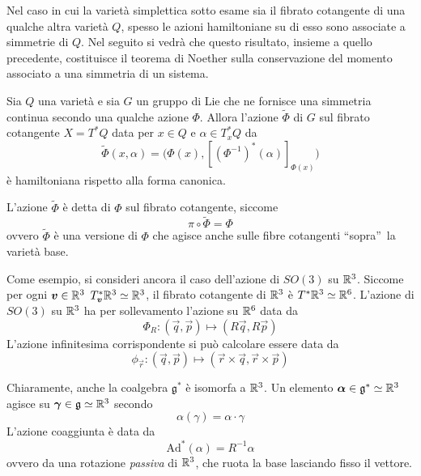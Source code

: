 Nel caso in cui la varietà simplettica sotto esame sia il fibrato cotangente di una qualche altra varietà $Q$, spesso le azioni hamiltoniane su di esso sono associate a simmetrie di $Q$. Nel seguito si vedrà che questo risultato, insieme a quello precedente, costituisce il teorema di Noether sulla conservazione del momento associato a una simmetria di un sistema.
\begin{theorem}
  Sia $Q$ una varietà e sia $G$ un gruppo di Lie che ne fornisce una simmetria continua secondo una qualche azione $\Phi$. Allora l'azione $\tilde{\Phi}$ di $G$ sul fibrato cotangente $X=T^*Q$ data per $x \in Q$ e $\alpha \in T^*_x Q$ da
  \begin{equation*}
  \tilde{\Phi}(x,\alpha) = \big(\Phi(x), [(\Phi^{-1})^*(\alpha)]_{\Phi(x)}\big)
  \end{equation*} 
  è hamiltoniana rispetto alla forma canonica.
\end{theorem}
\begin{remark}
  L'azione $\tilde{\Phi}$ è detta  di $\Phi$ sul fibrato cotangente, siccome \begin{equation*}
  \pi \circ \tilde{\Phi} = \Phi
  \end{equation*}
  ovvero $\tilde{\Phi}$ è una versione di $\Phi$ che agisce anche sulle fibre cotangenti \textquotedblleft sopra\textquotedblright\ la varietà base.
\end{remark}

Come esempio, si consideri ancora il caso dell'azione di $SO(3)$ su $\mathbb{R}^3$. Siccome per ogni $\boldsymbol{v} \in  \mathbb{R}^3$ $T^*_{\boldsymbol{v}}\mathbb{R}^3 \simeq \mathbb{R}^3$, il fibrato cotangente di $\mathbb{R}^3$ è $T^*\mathbb{R}^3 \simeq \mathbb{R}^6$. L'azione di $SO(3)$ su $\mathbb{R}^3$ ha per sollevamento l'azione su $\mathbb{R}^6$ data da 
\begin{equation*}
\Phi_R: (\vec{q},\vec{p}) \mapsto (R\vec{q},R\vec{p})
\end{equation*}  
L'azione infinitesima corrispondente si può calcolare essere data da
\begin{equation*}
\phi_{\vec{r}}: (\vec{q},\vec{p}) \mapsto (\vec{r}\times \vec{q},\vec{r}\times \vec{p})
\end{equation*}

Chiaramente, anche la coalgebra $\mathfrak{g}^*$ è isomorfa a $\mathbb{R}^3$. Un elemento $\boldsymbol{\alpha} \in \mathfrak{g}^* \simeq \mathbb{R}^3$ agisce su $\boldsymbol{\gamma} \in \mathfrak{g} \simeq \mathbb{R}^3$ secondo
\begin{equation*}
\alpha(\gamma) = \alpha \cdot \gamma
\end{equation*} 
L'azione coaggiunta è data da 
\begin{equation*}
\mathrm{Ad^*}(\alpha) = R^{-1}\alpha
\end{equation*} 
ovvero da una rotazione \emph{passiva} di $\mathbb{R}^3$, che ruota la base lasciando fisso il vettore.

